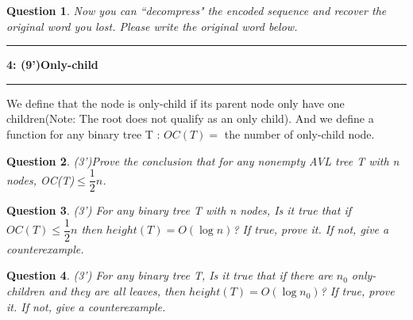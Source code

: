 \documentclass[10.5pt]{article}
\newcommand\question[2]{\vspace{.25in}\hrule\textbf{#1: #2}\vspace{.5em}\hrule\vspace{.10in}}
\newtheorem{Q}{Question}
\begin{document}
	\vspace{3cm}
	\begin{Q} Now you can ``decompress" the encoded sequence and recover the original word you lost. Please write the original word below.
	\end{Q}
	
\newpage

	
	\question{4}{(9')Only-child}
	We define that the node is only-child if its parent node only have one children(Note: The root does not qualify as an only child). And we define a function for any binary tree T : $OC(T)=$ the number of only-child node.
	
	
	\begin{Q}
		(3')Prove the conclusion that for any nonempty AVL tree T with n nodes, OC(T)$\leq\dfrac{1}{2}n$.
	\end{Q}

	\vspace{6cm}
	\begin{Q}
		(3') For any binary tree T with n nodes, Is it true that if $OC(T)\leq\dfrac{1}{2}n$ then $height(T)=O(\log n)$? If true, prove it. If not, give a counterexample.
	\end{Q}

	\vspace{6cm}
	\begin{Q}
		(3') For any binary tree T, Is it true that if there are $n_0$ only-children and they are all leaves, then $height(T)=O(\log {n_0})$?
		If true, prove it. If not, give a counterexample.
	\end{Q}
\end{document}
